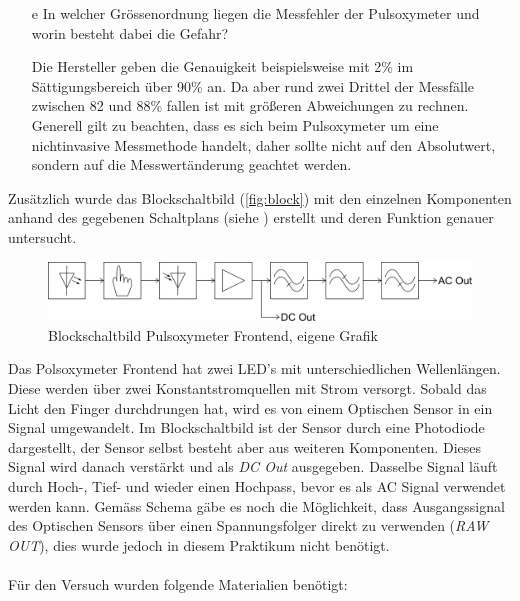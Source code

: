 \documentclass[11pt]{scrartcl}
\begin{document}
\begin{itemize}
\begin{equation}
        \end{equation}
        \item[e] In welcher Grössenordnung liegen die Messfehler der Pulsoxymeter und worin
        besteht dabei die Gefahr? 
        \item[] Die Hersteller geben die Genauigkeit beispielsweise mit 2\% im Sättigungsbereich über 90\% an.
        Da aber rund zwei Drittel der Messfälle zwischen 82 und 88\% fallen ist mit größeren Abweichungen zu rechnen. 
        Generell gilt zu beachten, dass es sich beim Pulsoxymeter um eine nichtinvasive Messmethode handelt,
        daher sollte nicht auf den Absolutwert, sondern auf die Messwertänderung geachtet werden.
    \end{itemize}

    Zusätzlich wurde das Blockschaltbild (\autoref{fig:block}) mit den einzelnen Komponenten anhand des
    gegebenen Schaltplans (siehe \cite{schaltplan}) erstellt und deren Funktion genauer untersucht.

    \begin{figure}[H]
        \centering
        \includegraphics[width=15cm]{../images/Blockschaltbild}
        \caption{Blockschaltbild Pulsoxymeter Frontend, eigene Grafik}
        \label{fig:block}
    \end{figure}

    Das Polsoxymeter Frontend hat zwei LED's mit unterschiedlichen Wellenlängen.
    Diese werden über zwei Konstantstromquellen mit Strom versorgt.
    Sobald das Licht den Finger durchdrungen hat, wird es von einem Optischen Sensor in ein Signal umgewandelt.
    Im Blockschaltbild ist der Sensor durch eine Photodiode dargestellt, der Sensor selbst besteht aber aus weiteren Komponenten.
    Dieses Signal wird danach verstärkt und als \emph{DC Out} ausgegeben.
    Dasselbe Signal läuft durch Hoch-, Tief- und wieder einen Hochpass, bevor es als AC Signal verwendet werden kann.
    Gemäss Schema gäbe es noch die Möglichkeit, dass Ausgangssignal des Optischen Sensors über einen Spannungsfolger
    direkt zu verwenden (\emph{RAW OUT}), dies wurde jedoch in diesem Praktikum nicht benötigt.
    \\\\

    Für den Versuch wurden folgende Materialien benötigt:
\end{document}
